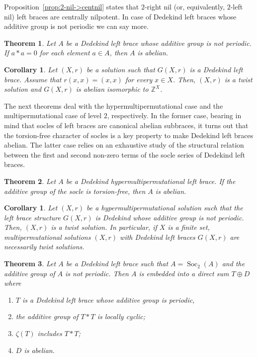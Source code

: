 \documentclass[12pt, a4paper, english]{article}
\newtheorem{corolari}[teorema]{Corollary}
\newtheorem{athm}{Theorem}
\theoremstyle{definition}
\DeclareMathOperator{\Soc}{Soc}
\begin{document}
Proposition~\ref{prop:2-nil->centnil} states that $2$-right nil (or, equivalently, $2$-left nil) left braces are centrally nilpotent. In case of Dedekind left braces whose additive group is not periodic we can say more.

\begin{athm}
\label{ateo:2.11nou}
Let $A$ be a Dedekind left brace whose additive group is not periodic. If $a \ast a = 0$ for each element $a\in A$, then $A$ is abelian.
\end{athm}

\begin{corolari}
\label{cor:twistsolutions}
Let $(X,r)$ be a solution such that $G(X,r)$ is a Dedekind left brace. Assume that $r(x,x) = (x,x)$ for every $x\in X$. Then, $(X,r)$ is a twist solution and $G(X,r)$ is abelian isomorphic to $\mathbb{Z}^X$.
\end{corolari}

The next theorems deal with the hypermultipermutational case and the multipermutational case of level $2$, respectively. In the former case, bearing in mind that socles of left braces are canonical abelian subbraces, it turns out that the torsion-free character of socles is a key property to make Dedekind left braces abelian. The latter case relies on an exhaustive study of the structural relation between the first and  second non-zero terms of the socle series of Dedekind left braces.


\begin{athm}
\label{ateo:Ahypersoc_torsionfreee->Aabelian}
Let $A$ be a Dedekind hypermultipermutational left brace. If the additive group of the socle is torsion-free, then $A$ is abelian.
\end{athm}

\begin{corolari}
\label{cor:mult+dedekind->twist}
Let $(X,r)$ be a hypermultipermutational solution such that the left brace structure $G(X,r)$ is Dedekind whose additive group is not periodic. Then, $(X,r)$ is a twist solution. In particular, if $X$ is a finite set, multipermutational solutions $(X,r)$ with Dedekind left braces $G(X,r)$ are necessarily twist solutions.
\end{corolari}


\begin{athm}
\label{ateo:2.17nou}
Let $A$ be a Dedekind left brace such that $A = \Soc_2(A)$ and the additive group of $A$ is not periodic. Then $A$ is embedded into a direct sum $T \oplus D$ where
\begin{enumerate}
\item $T$ is a Dedekind left brace whose  additive group is periodic,
\item the additive group of $T\ast T$ is locally cyclic;
\item $\zeta(T)$ includes $T\ast T$;
\item $D$ is abelian.
\end{enumerate}

\end{athm}
\end{document}
